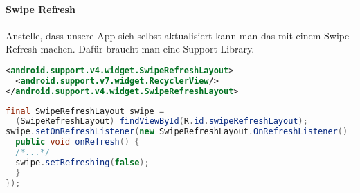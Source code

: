 \paragraph{Swipe Refresh} Anstelle, dass unsere App sich selbst aktualisiert kann man das mit einem Swipe Refresh machen. Dafür braucht man eine Support Library.
\begin{lstlisting}[language=xml]
<android.support.v4.widget.SwipeRefreshLayout>
  <android.support.v7.widget.RecyclerView/>
</android.support.v4.widget.SwipeRefreshLayout>
\end{lstlisting}
\begin{lstlisting}[language=java]
final SwipeRefreshLayout swipe = 
  (SwipeRefreshLayout) findViewById(R.id.swipeRefreshLayout);
swipe.setOnRefreshListener(new SwipeRefreshLayout.OnRefreshListener() {
  public void onRefresh() {
  /*...*/
  swipe.setRefreshing(false);
  }
});
\end{lstlisting}
